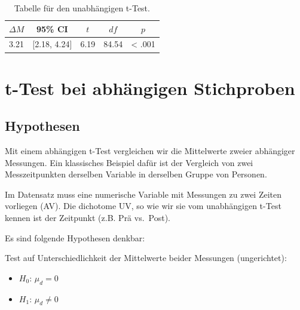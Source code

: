 \documentclass[
]{book}
\providecommand{\tightlist}{%
  \setlength{\itemsep}{0pt}\setlength{\parskip}{0pt}}
\begin{document}
\begin{table}[tbp]

\begin{center}
\begin{threeparttable}

\caption{\label{tab:unnamed-chunk-247}Tabelle für den unabhängigen t-Test.}

\begin{tabular}{lllll}
\toprule
$\Delta M$ & \multicolumn{1}{c}{95\% CI} & \multicolumn{1}{c}{$t$} & \multicolumn{1}{c}{$\mathit{df}$} & \multicolumn{1}{c}{$p$}\\
\midrule
3.21 & {}[2.18, 4.24] & 6.19 & 84.54 & < .001\\
\bottomrule
\end{tabular}

\end{threeparttable}
\end{center}

\end{table}

\hypertarget{t-test-bei-abhuxe4ngigen-stichproben}{%
\section{t-Test bei abhängigen Stichproben}\label{t-test-bei-abhuxe4ngigen-stichproben}}

\hypertarget{hypothesen-3}{%
\subsection{Hypothesen}\label{hypothesen-3}}

Mit einem abhängigen t-Test vergleichen wir die Mittelwerte zweier abhängiger Messungen. Ein klassisches Beispiel dafür ist der Vergleich von zwei Messzeitpunkten derselben Variable in derselben Gruppe von Personen.

Im Datensatz muss eine numerische Variable mit Messungen zu zwei Zeiten vorliegen (AV). Die dichotome UV, so wie wir sie vom unabhängigen t-Test kennen ist der Zeitpunkt (z.B. Prä vs.~Post).

Es sind folgende Hypothesen denkbar:

Test auf Unterschiedlichkeit der Mittelwerte beider Messungen (ungerichtet):

\begin{itemize}
\tightlist
\item
  \(H_0\): \(μ_d = 0\)
\item
  \(H_1\): \(μ_d \neq 0\)
\end{itemize}
\end{document}
